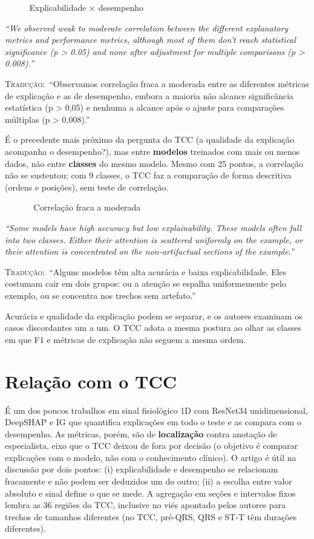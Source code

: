 \documentclass[11pt,a4paper]{article}
\newcommand{\pagechip}[1]{{\setlength{\fboxsep}{1.5pt}\colorbox{cAcc}{\textcolor{white}{\scriptsize\texttt{#1}}}}}
\newenvironment{origquote}{\par\itshape\small}{\par}
\newenvironment{tradquote}{\par\small\textsc{Tradução:}\ }{\par}
\newcommand{\explab}[1]{\par\smallskip{\small\color{cAcc}\textbf{\MakeUppercase{#1}}}\par}
\begin{document}
\begin{citacard}{\pagechip{§ V.D} Explicabilidade × desempenho}
\begin{origquote}“We observed weak to moderate correlation between the different explanatory metrics and performance metrics, although most of them don’t reach statistical significance (p > 0.05) and none after adjustment for multiple comparisons (p > 0.008).”\end{origquote}
\begin{tradquote}“Observamos correlação fraca a moderada entre as diferentes métricas de explicação e as de desempenho, embora a maioria não alcance significância estatística (p > 0,05) e nenhuma a alcance após o ajuste para comparações múltiplas (p > 0,008).”\end{tradquote}
\explab{Explicação}
É o precedente mais próximo da pergunta do TCC (a qualidade da explicação acompanha o desempenho?), mas entre \textbf{modelos} treinados com mais ou menos dados, não entre \textbf{classes} do mesmo modelo. Mesmo com 25 pontos, a correlação não se sustentou; com 9 classes, o TCC faz a comparação de forma descritiva (ordens e posições), sem teste de correlação.
\end{citacard}

\begin{citacard}{\pagechip{§ VI.D} Correlação fraca a moderada}
\begin{origquote}“Some models have high accuracy but low explainability. These models often fall into two classes. Either their attention is scattered uniformly on the example, or their attention is concentrated on the non-artifactual sections of the example.”\end{origquote}
\begin{tradquote}“Alguns modelos têm alta acurácia e baixa explicabilidade. Eles costumam cair em dois grupos: ou a atenção se espalha uniformemente pelo exemplo, ou se concentra nos trechos sem artefato.”\end{tradquote}
\explab{Explicação}
Acurácia e qualidade da explicação podem se separar, e os autores examinam os casos discordantes um a um. O TCC adota a mesma postura ao olhar as classes em que F1 e métricas de explicação não seguem a mesma ordem.
\end{citacard}

\section{Relação com o TCC}
É um dos poucos trabalhos em sinal fisiológico 1D com ResNet34 unidimensional, DeepSHAP e IG que quantifica explicações em todo o teste e as compara com o desempenho. As métricas, porém, são de \textbf{localização} contra anotação de especialista, eixo que o TCC deixou de fora por decisão (o objetivo é comparar explicações com o modelo, não com o conhecimento clínico). O artigo é útil na discussão por dois pontos: (i) explicabilidade e desempenho se relacionam fracamente e não podem ser deduzidos um do outro; (ii) a escolha entre valor absoluto e sinal define o que se mede. A agregação em seções e intervalos fixos lembra as 36 regiões do TCC, inclusive no viés apontado pelos autores para trechos de tamanhos diferentes (no TCC, pré-QRS, QRS e ST-T têm durações diferentes).
\end{document}
